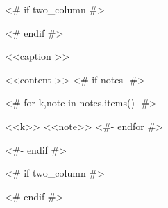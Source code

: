 \begin{<< env  >>}
  \centering
  <# if two_column #>
  \begin{adjustbox}{width=\textwidth}
  <# endif #>
  \begin{threeparttable}
    \caption{<<caption >>}
    \label{tbl:<< id >>}
    <<content >>
    <# if notes -#>
    \begin{tablenotes}
      <# for k,note in notes.items() -#>
      \item[<<k>>] <<note>>
      <#- endfor #>
    \end{tablenotes}
    <#- endif #>
  \end{threeparttable}
  <# if two_column #>
  \end{adjustbox}
  <# endif #>
\end{<< env  >>}

